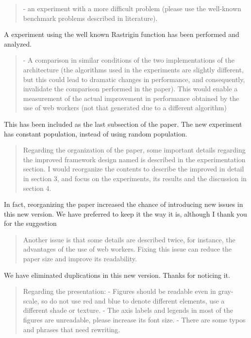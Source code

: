 \documentclass[preprint]{elsarticle}
\begin{document}
\begin{quote}
-  an experiment with a more difficult problem (please use the well-known benchmark problems
described in literature).
\end{quote}

A experiment using the well known Rastrigin function has been
performed and analyzed.

\begin{quote}
-  A comparison in similar conditions of the two implementations of the architecture (the algorithms
used in the experiments are slightly different, but this could lead to dramatic changes in
performance, and consequently, invalidate the comparison performed in the paper). This would
enable a measurement of the actual improvement in performance obtained by the use of web
workers (not that generated due to a different algorithm)
\end{quote}

This has been included as the last subsection of the paper. The new
experiment has constant population, instead of using random
population. 

\begin{quote}
Regarding the organization of the paper, some important details regarding the improved framework
design named is described in the experimentation section. I would reorganize the contents to describe the
improved in detail in section 3, and focus on the experiments, its
results and the discussion in section 4.
\end{quote}

In fact, reorganizing the paper increased the chance of introducing
new issues in this new version. We have preferred to keep it the way
it is, although I thank you for the suggestion

\begin{quote}
Another issue is that some details are described twice, for instance, the advantages of the use of web
workers. Fixing this issue can reduce the paper size and improve its
readability.
\end{quote}

We have eliminated duplications in this new version. Thanks for
noticing it.

\begin{quote}
Regarding the presentation:
-  Figures should be readable even in gray-scale, so do not use red and blue to denote different
elements, use a different shade or texture.
-  The axis labels and legends in most of the figures are unreadable, please increase its font size.
-  There are some typos and phrases that need rewriting.
\end{quote}
\end{document}
